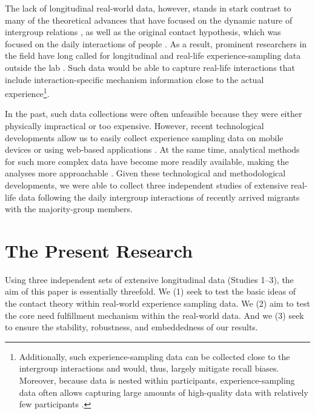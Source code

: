 \documentclass[man, 12pt, a4paper, mask]{apa7}
\theoremstyle{break}
\theoremstyle{plain}
\begin{document}
The lack of longitudinal real-world data, however, stands in stark contrast to many of the theoretical advances that have focused on the dynamic nature of intergroup relations \citep[e.g.,][]{Pettigrew1998}, as well as the original contact hypothesis, which was focused on the daily interactions of people \citep[][]{Allport1954b}. As a result, prominent researchers in the field have long called for longitudinal \citep[][]{Pettigrew1998, Pettigrew2008, Pettigrew2011} and real-life experience-sampling data outside the lab \citep[ESM][]{MacInnis2015, McKeown2017}. Such data would be able to capture real-life interactions that include interaction-specific mechanism information close to the actual experience\footnote{Additionally, such experience-sampling data can be collected close to the intergroup interactions and would, thus, largely mitigate recall biases. Moreover, because data is nested within participants, experience-sampling data often allows capturing large amounts of high-quality data with relatively few participants \citep[][]{shiffman2008}.}.

In the past, such data collections were often unfeasible because they were either physically impractical or too expensive. However, recent technological developments allow us to easily collect experience sampling data on mobile devices \citep[e.g.,][]{Keil2020} or using web-based applications \citep[e.g.,][]{Arslan2020}. At the same time, analytical methods for such more complex data have become more readily available, making the analyses more approachable \citep[e.g., see][]{ODonnell2021}. Given these technological and methodological developments, we were able to collect three independent studies of extensive real-life data following the daily intergroup interactions of recently arrived migrants with the majority-group members.  

\section{The Present Research}
Using three independent sets of extensive longitudinal data (Studies 1–3), the aim of this paper is essentially threefold. We (1) seek to test the basic ideas of the contact theory within real-world experience sampling data. We (2) aim to test the core need fulfillment mechanism within the real-world data. And we (3) seek to ensure the stability, robustness, and embeddedness of our results.
\end{document}

